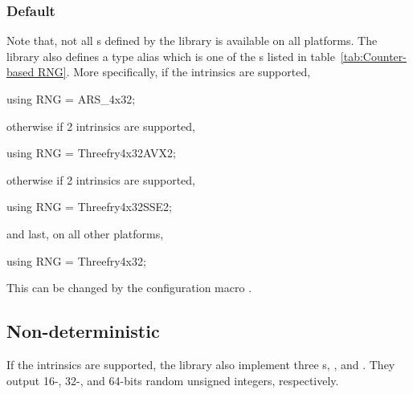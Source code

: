 \subsubsection{Default \protect\rng}
\label{ssub:Default RNG}

Note that, not all \rng{}s defined by the library is available on all
platforms. The library also defines a type alias  which is one
of the \rng{}s listed in table~\ref{tab:Counter-based RNG}. More specifically,
if the \aesni intrinsics are supported,
\begin{cppcode}
  using RNG = ARS_4x32;
\end{cppcode}
otherwise if \avx{}2 intrinsics are supported,
\begin{cppcode}
  using RNG = Threefry4x32AVX2;
\end{cppcode}
otherwise if \sse{}2 intrinsics are supported,
\begin{cppcode}
  using RNG = Threefry4x32SSE2;
\end{cppcode}
and last, on all other platforms,
\begin{cppcode}
  using RNG = Threefry4x32;
\end{cppcode}
This can be changed by the configuration macro .

\subsection{Non-deterministic \protect\rng}
\label{sub:Non-deterministic RNG}

If the \rdrand intrinsics are supported, the library also implement three
\rng{}s, ,  and .
They output 16-, 32-, and 64-bits random unsigned integers, respectively.

\subsection{\protect\mkl{} \protect\rng}
\label{sub:MKL RNG}

